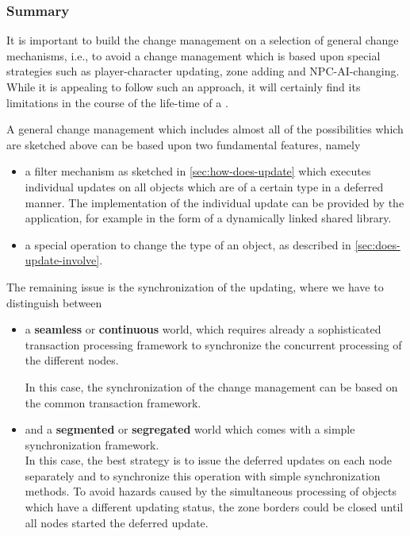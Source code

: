 \documentclass[a4paper, 10pt]{book}
\begin{document}
            \subsubsection{Summary}

            It is important to build the change management on a selection of
            general change mechanisms, i.e., to avoid a change management which
            is based upon special strategies such as player-character updating, zone
            adding and NPC-AI-changing. While it is appealing to follow such an
            approach, it will certainly find its limitations in the course of the
            life-time of a \MMORG. 

            A general change management which includes almost all of the
            possibilities which are sketched above can be based upon two
            fundamental features, namely
            \begin{itemize}
                \item a filter mechanism as sketched in \vref{sec:how-does-update}
                    which executes individual updates on all objects which are of a
                    certain type in a deferred manner. The implementation of the
                    individual update can be provided by the application, for example in
                    the form of 
                    a dynamically linked shared library.
                \item a special operation to change the type of an object, as
                    described in \vref{sec:does-update-involve}.
            \end{itemize}
            The remaining issue is the synchronization of the updating, where we
            have to distinguish between
            \begin{itemize}
                \item a \textbf{seamless} or \textbf{continuous} world, which requires
                    already a sophisticated transaction processing framework to
                    synchronize the concurrent processing of the different nodes.

                    In this case, the synchronization of the change management can be
                    based on the common transaction framework. 
                \item and a \textbf{segmented} or \textbf{segregated} world which
                    comes with a simple synchronization framework.\\
                    In this case, the best strategy is to issue the deferred updates on
                    each node separately and to synchronize this operation with simple
                    synchronization methods. To avoid hazards caused by
                    the simultaneous processing of objects which have a different
                    updating status, the zone borders could be closed until all nodes
                    started the deferred update. 
            \end{itemize}
\end{document}
